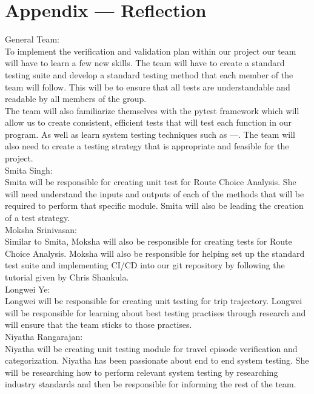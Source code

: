 \documentclass[12pt, titlepage]{article}
\begin{document}

\newpage{}
\section*{Appendix --- Reflection}
General Team:\\

\noindent To implement the verification and validation plan within our project our team will have to learn a few new skills. The team will have to create a standard testing suite and develop a standard testing method that each member of the team will follow. This will be to ensure that all tests are understandable and readable by all members of the group. \\

\noindent The team will also familiarize themselves with the pytest framework which will allow us to create consistent, efficient tests that will test each function in our program. As well as learn system testing techniques such as ---.  The team will also need to create a testing strategy that is appropriate and feasible for the project.\\

\noindent Smita Singh:\\ Smita will be responsible for creating unit test for Route Choice Analysis. She will need understand the inputs and outputs of each of the methods that will be required to perform that specific module. Smita will also be leading the creation of a test strategy. \\

\noindent Moksha Srinivasan:\\ Similar to Smita, Moksha will also be responsible for creating tests for Route Choice Analysis. Moksha will also be responsible for helping set up the standard test suite and implementing CI/CD into our git repository by following the tutorial given by Chris Shankula. \\

\noindent Longwei Ye:\\
Longwei will be responsible for creating unit testing for trip trajectory. Longwei will be responsible for learning about best testing practises through research and will ensure that the team sticks to those practises.\\

\noindent Niyatha Rangarajan:\\
Niyatha will be creating unit testing module for travel episode verification and categorization. Niyatha has been passionate about end to end system testing. She will be researching how to perform relevant system testing by researching industry standards and then be responsible for informing the rest of the team.\\
\end{document}
